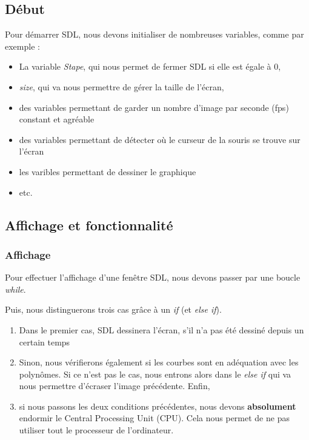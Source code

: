 \documentclass[letter]{article}
\begin{document}
\subsection{Début}
\label{sec:orgece06cf}

Pour démarrer SDL, nous devons initialiser de nombreuses variables, comme par exemple :

\begin{itemize}
\item La variable \emph{Stape}, qui nous permet de fermer SDL si elle est égale à 0,
\item \emph{size}, qui va nous permettre de gérer la taille de l'écran,
\item des variables permettant de garder un nombre d'image par seconde (fps) constant et agréable
\item des variables permettant de détecter où le curseur de la souris se trouve sur l'écran
\item les varibles permettant de dessiner le graphique
\item etc.
\end{itemize}




\subsection{Affichage et fonctionnalité}
\label{sec:org05fb25c}

\subsubsection{Affichage}
\label{sec:org9a912ae}

Pour effectuer l'affichage d'une fenêtre SDL, nous devons passer par une boucle \emph{while}.

Puis, nous distinguerons trois cas grâce à un \emph{if} (et \emph{else if}).

\begin{enumerate}
\item Dans le premier cas, SDL dessinera l'écran, s'il n'a pas été dessiné depuis un certain temps
\item Sinon, nous vérifierons également si les courbes sont en adéquation avec les polynômes. Si ce n'est pas le cas, nous entrons alors dans le \emph{else if} qui va nous permettre d'écraser l'image précédente. Enfin,
\item si nous passons les deux conditions précédentes, nous devons \textbf{absolument} endormir le Central Processing Unit (CPU). Cela nous permet de ne pas utiliser tout le processeur de l'ordinateur.
\end{enumerate}
\end{document}
